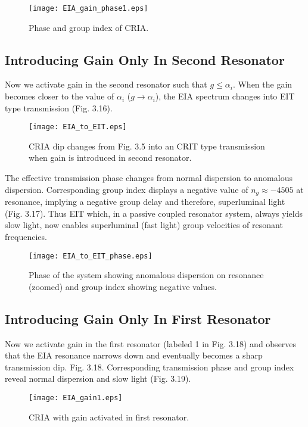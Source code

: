 \begin{figure}[h]
\centering
\texttt{[image: EIA\_gain\_phase1.eps]}
\caption{Phase and group index of CRIA.}
\end{figure}
  
\subsection{Introducing Gain Only In Second Resonator}
Now we activate gain in the second resonator such that $g \leqslant \alpha_{i}$.  When the gain becomes closer to the value of $\alpha_{i}$ ($g \to \alpha_{i}$), the EIA spectrum changes into EIT type transmission (Fig. 3.16).

\begin{figure}[h]
\centering
\texttt{[image: EIA\_to\_EIT.eps]}
\caption{CRIA dip changes from Fig. 3.5 into an CRIT type transmission when gain is introduced in second resonator.}
\end{figure}

The effective transmission phase changes from normal dispersion to anomalous dispersion. Corresponding group index displays a negative value of $n_{g} \approx -4505$ at resonance, implying a negative group delay and therefore, superluminal light (Fig. 3.17). Thus EIT which, in a passive coupled resonator system, always yields slow light, now enables superluminal (fast light) group velocities of resonant frequencies.

\begin{figure}[h]
\centering
\texttt{[image: EIA\_to\_EIT\_phase.eps]}
\caption{Phase of the system showing anomalous dispersion on resonance (zoomed) and group index showing negative values.}
\end{figure}

\subsection{Introducing Gain Only In First Resonator}
Now we activate gain in the first resonator (labeled 1 in Fig. 3.18) and observes that the EIA resonance narrows down and eventually becomes a sharp transmission dip. Fig. 3.18. Corresponding transmission phase and group index reveal normal dispersion and slow light (Fig. 3.19).


\begin{figure}[h]
\centering
\texttt{[image: EIA\_gain1.eps]}
\caption{CRIA with gain activated in first resonator.}
\end{figure}

